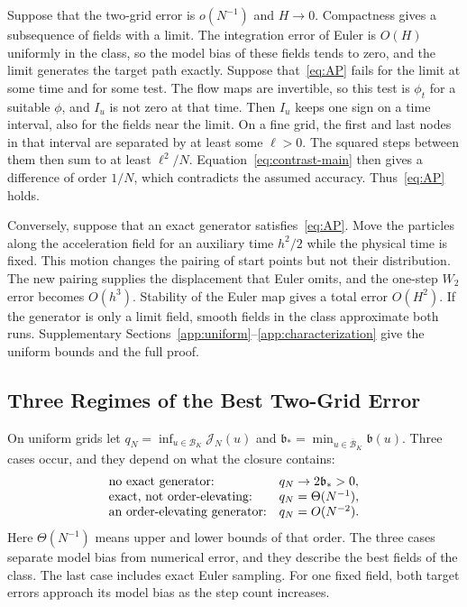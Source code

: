 Suppose that the two-grid error is $o(N^{-1})$ and $H\to0$. Compactness
gives a subsequence of fields with a limit. The integration error of
Euler is $O(H)$ uniformly in the class, so the model bias of these
fields tends to zero, and the limit generates the target path exactly.
Suppose that~\eqref{eq:AP} fails for the limit at some time and for some
test. The flow maps are invertible, so this test is $\phi_t$ for a
suitable $\phi$, and $I_u$ is not zero at that time. Then $I_u$ keeps
one sign on a time interval, also for the fields near the limit. On a fine grid, the first and last nodes in
that interval are separated by at least some $\ell>0$. The squared
steps between them then sum to at least $\ell^2/N$. Equation~\eqref{eq:contrast-main}
then gives a difference of order $1/N$, which contradicts the assumed
accuracy. Thus~\eqref{eq:AP} holds.

Conversely, suppose that an exact generator
satisfies~\eqref{eq:AP}. Move the particles along the acceleration
field for an auxiliary time $h^2/2$ while the physical time is fixed.
This motion changes the pairing of start points but not their
distribution. The new pairing supplies the displacement that Euler
omits, and the one-step $W_2$ error becomes $O(h^3)$. Stability of the
Euler map gives a total error $O(H^2)$. If the generator is only a limit
field, smooth fields in the class approximate both runs. Supplementary
Sections~\ref{app:uniform}--\ref{app:characterization} give the uniform
bounds and the full proof.

\subsection{Three Regimes of the Best Two-Grid Error}
On uniform grids let $q_N=\inf_{u\in\mathcal B_K}\mathcal J_N(u)$ and
$\mathfrak b_*=\min_{u\in\overline{\mathcal B}_K}\mathfrak b(u)$. Three
cases occur, and they depend on what the closure contains:
\begin{equation}\label{eq:regimes}
\begin{array}{@{}ll@{}}
\text{no exact generator:} & q_N\to2\mathfrak b_*>0,\\
\text{exact, not order-elevating:} & q_N=\Theta(N^{-1}),\\
\text{an order-elevating generator:} & q_N=O(N^{-2}).
\end{array}
\end{equation}
Here $\Theta(N^{-1})$ means upper and lower bounds of that order. The three cases separate model bias from numerical error, and they
describe the best fields of the class. The last case includes exact
Euler sampling. For one fixed field, both target errors approach its
model bias as the step count increases.

